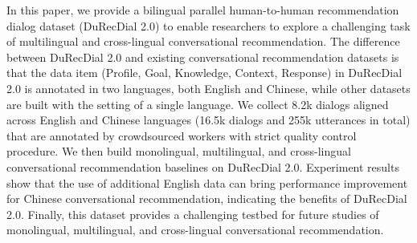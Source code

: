 In this paper, we provide a bilingual parallel human-to-human recommendation dialog dataset (DuRecDial 2.0) to enable researchers to explore a challenging task of multilingual and cross-lingual conversational recommendation. The difference between DuRecDial 2.0 and existing conversational recommendation datasets is that the data item (Profile, Goal, Knowledge, Context, Response) in DuRecDial 2.0 is annotated in two languages, both English and Chinese, while other datasets are built with the setting of a single language. We collect 8.2k dialogs aligned across English and Chinese languages (16.5k dialogs and 255k utterances in total) that are annotated by crowdsourced workers with strict quality control procedure. We then build monolingual, multilingual, and cross-lingual conversational recommendation baselines on DuRecDial 2.0. Experiment results show that the use of additional English data can bring performance improvement for Chinese conversational recommendation, indicating the benefits of DuRecDial 2.0. Finally, this dataset provides a challenging testbed for future studies of monolingual, multilingual, and cross-lingual conversational recommendation.
